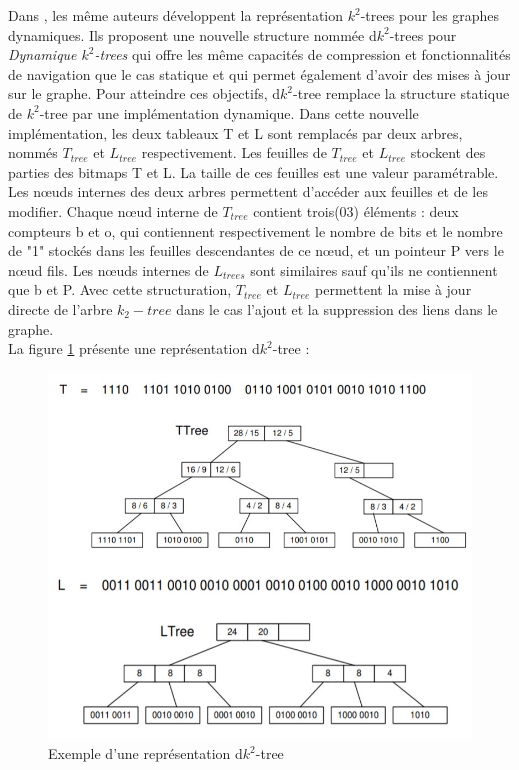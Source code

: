 Dans \citep{brisaboa2012compressed}, les même auteurs développent la représentation $k^2$-trees pour les graphes dynamiques. Ils proposent une nouvelle structure nommée d$k^2$-trees pour \textit{Dynamique $k^2$-trees} qui offre les même capacités de compression et fonctionnalités de navigation que le cas statique et qui permet également d'avoir des mises à jour sur le graphe. Pour atteindre ces objectifs, d$k^2$-tree remplace la structure statique de $k^2$-tree par une implémentation dynamique. Dans cette nouvelle implémentation, les deux tableaux T et L sont remplacés par deux arbres, nommés $T_{tree}$ et $L_{tree}$ respectivement. Les feuilles de $T_{tree}$ et $L_{tree}$ stockent des parties des bitmaps T et L. La taille de ces feuilles est une valeur paramétrable. Les nœuds internes des deux arbres permettent d'accéder aux feuilles et de les modifier.
Chaque nœud interne de $T_{tree}$ contient trois(03) éléments : deux compteurs b et o, qui contiennent respectivement le nombre de bits et le nombre de "1" stockés dans les feuilles descendantes de ce nœud, et un pointeur P vers le nœud fils. Les nœuds internes de $L_{trees}$ sont similaires sauf qu'ils ne contiennent que b et P. Avec cette structuration, $T_{tree}$ et $L_{tree}$ permettent la mise à jour directe de l'arbre $k_2-tree$ dans le cas l'ajout et la suppression des liens dans le graphe.\\
La figure \ref{dk2-trees} présente une représentation d$k^2$-tree \citep{brisaboa2012compressed}: 
\begin{figure}[H]
\begin{center}
\includegraphics[scale=0.7]{./ressources/image/dk2-trees.jpg} 
\end{center}
\caption{Exemple d'une représentation d$k^2$-tree}
\label{dk2-trees}
\end{figure}

